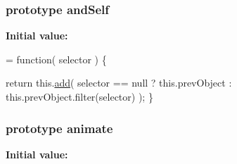 \hypertarget{jquery-1_810_82-vsdoc_8js_a2f03fdae45ba09ba33b777405f66b0c4}{
\subsubsection[{and\-Self}]{ {\bf prototype} and\-Self}}\label{jquery-1_810_82-vsdoc_8js_a2f03fdae45ba09ba33b777405f66b0c4}
{\bfseries Initial value\-:}
\begin{DoxyCode}
= \textcolor{keyword}{function}( selector ) \{


        \textcolor{keywordflow}{return} this.\hyperlink{jquery-1_810_82-vsdoc_8js_a2f34e089948aad779d5a43c9b381caa6}{add}( selector == null ?
            this.prevObject : this.prevObject.filter(selector)
        );
    \}
\end{DoxyCode}
\hypertarget{jquery-1_810_82-vsdoc_8js_a956a1d08128d41115c45b6815814a64d}{
\subsubsection[{animate}]{ {\bf prototype} animate}}\label{jquery-1_810_82-vsdoc_8js_a956a1d08128d41115c45b6815814a64d}
{\bfseries Initial value\-:}
